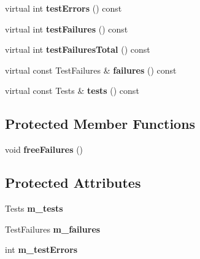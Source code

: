 \begin{DoxyCompactItemize}
\item 
\hypertarget{class_test_result_collector_a0dc4aa03e6b22907cd44cf30a9ea0af3}{virtual int {\bfseries test\-Errors} () const }\label{class_test_result_collector_a0dc4aa03e6b22907cd44cf30a9ea0af3}

\item 
\hypertarget{class_test_result_collector_a583a62791337a71725a719f57dc654e2}{virtual int {\bfseries test\-Failures} () const }\label{class_test_result_collector_a583a62791337a71725a719f57dc654e2}

\item 
\hypertarget{class_test_result_collector_a73417ff24fff145f3575c3860d8e9340}{virtual int {\bfseries test\-Failures\-Total} () const }\label{class_test_result_collector_a73417ff24fff145f3575c3860d8e9340}

\item 
\hypertarget{class_test_result_collector_a9c04c7276b1b19879cc3d51e9e9f33ff}{virtual const Test\-Failures \& {\bfseries failures} () const }\label{class_test_result_collector_a9c04c7276b1b19879cc3d51e9e9f33ff}

\item 
\hypertarget{class_test_result_collector_a25890515b8eba397855a64582d3e7a9b}{virtual const Tests \& {\bfseries tests} () const }\label{class_test_result_collector_a25890515b8eba397855a64582d3e7a9b}

\end{DoxyCompactItemize}
\subsection*{Protected Member Functions}
\begin{DoxyCompactItemize}
\item 
\hypertarget{class_test_result_collector_ae3ca204ba9e242a368843e91acf94766}{void {\bfseries free\-Failures} ()}\label{class_test_result_collector_ae3ca204ba9e242a368843e91acf94766}

\end{DoxyCompactItemize}
\subsection*{Protected Attributes}
\begin{DoxyCompactItemize}
\item 
\hypertarget{class_test_result_collector_a63950609cce95633b56850da67d4bfe0}{Tests {\bfseries m\-\_\-tests}}\label{class_test_result_collector_a63950609cce95633b56850da67d4bfe0}

\item 
\hypertarget{class_test_result_collector_ae2958ff17d1fd73092bf8ec4fc5db08f}{Test\-Failures {\bfseries m\-\_\-failures}}\label{class_test_result_collector_ae2958ff17d1fd73092bf8ec4fc5db08f}

\item 
\hypertarget{class_test_result_collector_a42fdacb6076281e8abb6eba08063fb4e}{int {\bfseries m\-\_\-test\-Errors}}\label{class_test_result_collector_a42fdacb6076281e8abb6eba08063fb4e}

\end{DoxyCompactItemize}


